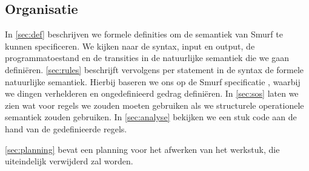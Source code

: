 \subsection{Organisatie} %

In \autoref{sec:def} beschrijven we formele definities om de semantiek van
Smurf te kunnen specificeren. We kijken naar de syntax, input en output, de
programmatoestand en de transities in de natuurlijke semantiek die we gaan
definiëren. \autoref{sec:rules} beschrijft vervolgens per statement in de
syntax de formele natuurlijke semantiek. Hierbij baseren we ons op de Smurf
specificatie \cite{safalra}, waarbij we dingen verhelderen en ongedefinieerd
gedrag definiëren. In \autoref{sec:sos} laten we zien wat voor regels we zouden
moeten gebruiken als we structurele operationele semantiek zouden gebruiken. In
\autoref{sec:analyse} bekijken we een stuk code aan de hand van de
gedefinieerde regels.

\autoref{sec:planning} bevat een planning voor het afwerken van het werkstuk,
die uiteindelijk verwijderd zal worden.

